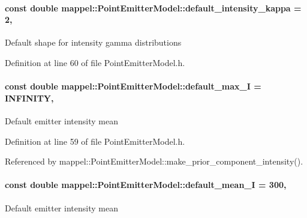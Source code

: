 \paragraph[{\texorpdfstring{default\+\_\+intensity\+\_\+kappa}{default_intensity_kappa}}]{\setlength{\rightskip}{0pt plus 5cm}const double mappel\+::\+Point\+Emitter\+Model\+::default\+\_\+intensity\+\_\+kappa = 2\hspace{0.3cm}{\ttfamily [static]}, {\ttfamily [inherited]}}\hypertarget{classmappel_1_1PointEmitterModel_ad1f21ed3be543deed3c78a0494cb2984}{}\label{classmappel_1_1PointEmitterModel_ad1f21ed3be543deed3c78a0494cb2984}
Default shape for intensity gamma distributions 

Definition at line 60 of file Point\+Emitter\+Model.\+h.

\paragraph[{\texorpdfstring{default\+\_\+max\+\_\+I}{default_max_I}}]{\setlength{\rightskip}{0pt plus 5cm}const double mappel\+::\+Point\+Emitter\+Model\+::default\+\_\+max\+\_\+I = I\+N\+F\+I\+N\+I\+TY\hspace{0.3cm}{\ttfamily [static]}, {\ttfamily [inherited]}}\hypertarget{classmappel_1_1PointEmitterModel_acca80757a9a285a9e6eedea167d038c7}{}\label{classmappel_1_1PointEmitterModel_acca80757a9a285a9e6eedea167d038c7}
Default emitter intensity mean 

Definition at line 59 of file Point\+Emitter\+Model.\+h.



Referenced by mappel\+::\+Point\+Emitter\+Model\+::make\+\_\+prior\+\_\+component\+\_\+intensity().

\paragraph[{\texorpdfstring{default\+\_\+mean\+\_\+I}{default_mean_I}}]{\setlength{\rightskip}{0pt plus 5cm}const double mappel\+::\+Point\+Emitter\+Model\+::default\+\_\+mean\+\_\+I = 300\hspace{0.3cm}{\ttfamily [static]}, {\ttfamily [inherited]}}\hypertarget{classmappel_1_1PointEmitterModel_a575dd30a0afb886db82ac725c8cc8df3}{}\label{classmappel_1_1PointEmitterModel_a575dd30a0afb886db82ac725c8cc8df3}
Default emitter intensity mean 

